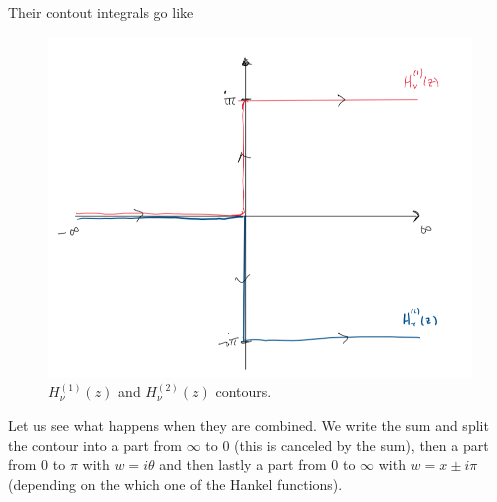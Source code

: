 \documentclass[a4paper,12pt]{article}
\begin{document}
Their contout integrals go like
\begin{figure}[H]
	\centering
	\includegraphics[width=0.45\linewidth]{25}
	\caption{$H_{\nu}^{(1)}(z)$ and $H_{\nu}^{(2)}(z)$ contours.}
	\label{fig:rectangle}
\end{figure}
Let us see what happens when they are combined. We write the sum and split the contour into a part from $\infty$ to 0 (this is canceled by the sum), then a part from $0$ to $\pi$ with $w=i\theta$ and then lastly a part from 0 to $\infty$ with $w=x\pm i\pi$ (depending on the which one of the Hankel functions).
\end{document}
